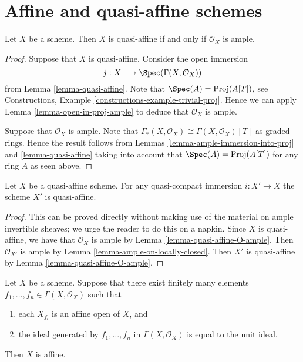 \section{Affine and quasi-affine schemes}
\label{section-affine-quasi-affine}

\begin{lemma}
\label{lemma-quasi-affine-O-ample}
Let $X$ be a scheme.
Then $X$ is quasi-affine if and only if $\mathcal{O}_X$ is ample.
\end{lemma}

\begin{proof}
Suppose that $X$ is quasi-affine. Consider the open immersion
$$
j : X \longrightarrow \Spec(\Gamma(X, \mathcal{O}_X))
$$
from Lemma \ref{lemma-quasi-affine}. Note that
$\Spec(A) = \text{Proj}(A[T])$, see
Constructions, Example \ref{constructions-example-trivial-proj}.
Hence we can apply Lemma \ref{lemma-open-in-proj-ample}
to deduce that $\mathcal{O}_X$ is ample.

\medskip\noindent
Suppose that $\mathcal{O}_X$ is ample.
Note that $\Gamma_*(X, \mathcal{O}_X) \cong \Gamma(X, \mathcal{O}_X)[T]$
as graded rings. Hence the result follows from Lemmas
\ref{lemma-ample-immersion-into-proj} and \ref{lemma-quasi-affine}
taking into account that
$\Spec(A) = \text{Proj}(A[T])$ for any ring $A$
as seen above.
\end{proof}

\begin{lemma}
\label{lemma-quasi-affine-locally-closed}
Let $X$ be a quasi-affine scheme. For any quasi-compact immersion
$i : X' \to X$ the scheme $X'$ is quasi-affine.
\end{lemma}

\begin{proof}
This can be proved directly without making use of the material on
ample invertible sheaves; we urge the reader to do this on a napkin.
Since $X$ is quasi-affine, we have that $\mathcal{O}_X$ is ample by
Lemma \ref{lemma-quasi-affine-O-ample}.
Then $\mathcal{O}_{X'}$ is ample by
Lemma \ref{lemma-ample-on-locally-closed}. Then $X'$ is quasi-affine by
Lemma \ref{lemma-quasi-affine-O-ample}.
\end{proof}

\begin{lemma}
\label{lemma-characterize-affine}
Let $X$ be a scheme. Suppose that there exist finitely many elements
$f_1, \ldots, f_n \in \Gamma(X, \mathcal{O}_X)$ such that
\begin{enumerate}
\item each $X_{f_i}$ is an affine open of $X$, and
\item the ideal generated by $f_1, \ldots, f_n$ in
$\Gamma(X, \mathcal{O}_X)$ is equal to the unit ideal.
\end{enumerate}
Then $X$ is affine.
\end{lemma}


